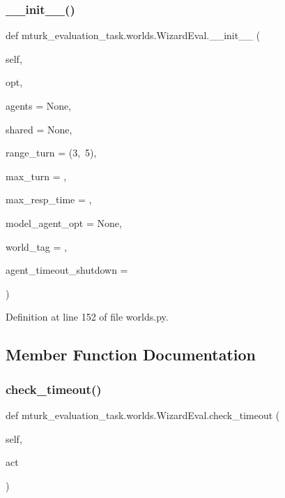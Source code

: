 \subsubsection{\texorpdfstring{\+\_\+\+\_\+init\+\_\+\+\_\+()}{\_\_init\_\_()}}
{\footnotesize\ttfamily def mturk\+\_\+evaluation\+\_\+task.\+worlds.\+Wizard\+Eval.\+\_\+\+\_\+init\+\_\+\+\_\+ (\begin{DoxyParamCaption}\item[{}]{self,  }\item[{}]{opt,  }\item[{}]{agents = {\ttfamily None},  }\item[{}]{shared = {\ttfamily None},  }\item[{}]{range\+\_\+turn = {\ttfamily (3,~5)},  }\item[{}]{max\+\_\+turn = {},  }\item[{}]{max\+\_\+resp\+\_\+time = {},  }\item[{}]{model\+\_\+agent\+\_\+opt = {\ttfamily None},  }\item[{}]{world\+\_\+tag = {\ttfamily \textquotesingle{}\textquotesingle{}},  }\item[{}]{agent\+\_\+timeout\+\_\+shutdown = {} }\end{DoxyParamCaption})}



Definition at line 152 of file worlds.\+py.



\subsection{Member Function Documentation}
\mbox{\label{classmturk__evaluation__task_1_1worlds_1_1WizardEval_aa7477247b6a732f69d461fca5c02945a}} 
\subsubsection{\texorpdfstring{check\+\_\+timeout()}{check\_timeout()}}
{\footnotesize\ttfamily def mturk\+\_\+evaluation\+\_\+task.\+worlds.\+Wizard\+Eval.\+check\+\_\+timeout (\begin{DoxyParamCaption}\item[{}]{self,  }\item[{}]{act }\end{DoxyParamCaption})}



